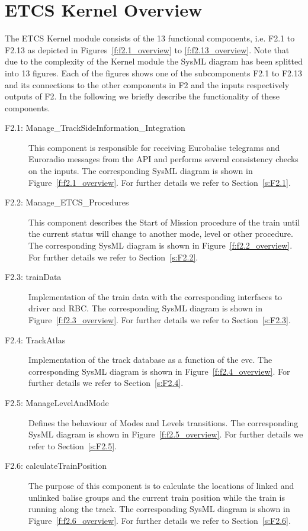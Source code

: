 \section{ETCS Kernel Overview}\label{s:ETCS_Kernel_Overview}

The ETCS Kernel module consists of the 13 functional components, i.e. F2.1 to F2.13 as depicted in Figures~\ref{f:f2.1_overview} to \ref{f:f2.13_overview}. Note that due to the complexity of the Kernel module the SysML diagram has been splitted into 13 figures. Each of the figures shows one of the subcomponents F2.1 to F2.13 and its connections to the other components in F2 and the inputs respectively outputs of F2. In the following we briefly describe the functionality of these components.
\begin{description}
\item[F2.1: Manage\_TrackSideInformation\_Integration] This component is responsible for receiving Eurobalise telegrams and Euroradio messages from the API and performs several consistency checks on the inputs. The corresponding SysML diagram is shown in Figure~\ref{f:f2.1_overview}. For further details we refer to Section~\ref{s:F2.1}.

\item[F2.2: Manage\_ETCS\_Procedures] This component describes the Start of Mission procedure of the train until the current status will change to another mode, level or other procedure. The corresponding SysML diagram is shown in Figure~\ref{f:f2.2_overview}. For further details we refer to Section~\ref{s:F2.2}.

\item[F2.3: trainData] Implementation of the train data with the corresponding interfaces to  driver and RBC. The corresponding SysML diagram is shown in Figure~\ref{f:f2.3_overview}. For further details we refer to Section~\ref{s:F2.3}.

\item[F2.4: TrackAtlas] Implementation of the track database as a function of the evc.  The corresponding SysML diagram is shown in Figure~\ref{f:f2.4_overview}. For further details we refer to Section~\ref{s:F2.4}.

\item[F2.5: ManageLevelAndMode] Defines the behaviour of Modes and Levels transitions. The corresponding SysML diagram is shown in Figure~\ref{f:f2.5_overview}. For further details we refer to Section~\ref{s:F2.5}.

\item[F2.6: calculateTrainPosition] The purpose of this component is to calculate the locations of linked and unlinked balise groups and the current train position while the train is running along the track. The corresponding SysML diagram is shown in Figure~\ref{f:f2.6_overview}. For further details we refer to Section~\ref{s:F2.6}.



\end{description}
